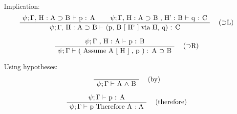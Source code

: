 \documentclass[twoside,a4paper]{article}
\begin{document}
Implication:
\[
\AxiomC{$\psi ; \Gamma ,$ H : A $\supset$ B $\vdash$ p : A}
\AxiomC{$\psi ; \Gamma ,$ H : A $\supset$ B , H' : B $\vdash$ q : C}
\RightLabel{\quad ($\supset$L)}
\BinaryInfC{$\psi ; \Gamma ,$ H : A $\supset$ B $\vdash$
(p, B [ H' ] via H, q) : C}
\DisplayProof
\]

\[
\AxiomC{$\psi ; \Gamma$ , H : A $\vdash$ p : B}
\RightLabel{\quad ($\supset$R)}
\UnaryInfC{$\psi ; \Gamma \vdash$ ( Assume A [ H ] , p ) : A 
$\supset$ B}
\DisplayProof
\]

Using hypotheses:

\[
\AxiomC{}
\RightLabel{\quad (by)}
\UnaryInfC{$\psi ; \Gamma \vdash$ A $\wedge$ B}
\DisplayProof
\]

\[
\AxiomC{$\psi ; \Gamma \vdash$ p : A}
\RightLabel{\quad (therefore)}
\UnaryInfC{$\psi ; \Gamma \vdash$ p Therefore A : A}
\DisplayProof
\]
\end{document}
